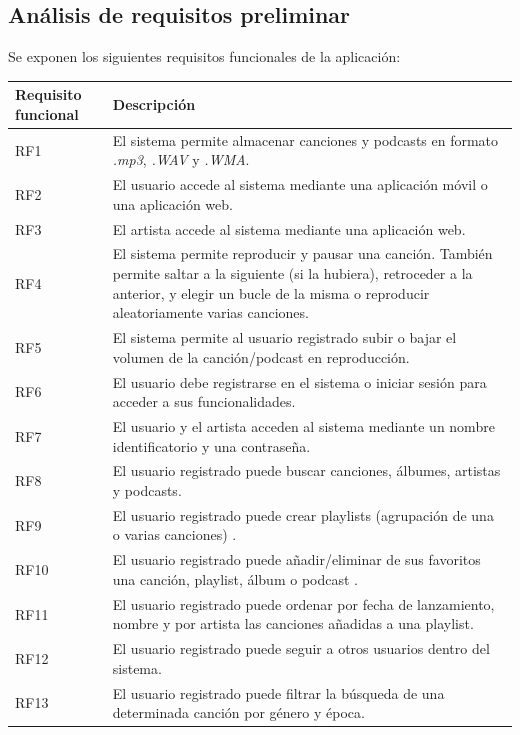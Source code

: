 \documentclass{article}
\begin{document}
\subsection{Análisis de requisitos preliminar}
Se exponen los siguientes requisitos funcionales de la aplicación:
\begin{table}[H]
	\begin{tabular}{p{4cm} p{10cm}}
		\hline
		\hline 
		\textbf{Requisito funcional}
		\vspace{0.5mm} & \textbf{Descripción} \\ 
		\hline
		\hline
		RF1
		& El sistema permite almacenar canciones y podcasts en formato \textit{.mp3}, \textit{.WAV} y \textit{.WMA}. \\ 
		\hline 
		RF2
		& El usuario accede al sistema mediante una aplicación móvil o una aplicación web. \\ 
		\hline
		RF3
		& El artista accede al sistema mediante una aplicación web. \\ 
		\hline
		RF4
		& El sistema permite reproducir y pausar una canción. También permite saltar a la siguiente (si la hubiera), retroceder a la anterior, y elegir un bucle de la misma o reproducir aleatoriamente varias canciones. \\ 
		\hline
		RF5
		& El sistema permite al usuario registrado subir o bajar el volumen de la canción/podcast en reproducción. \\ 
		\hline
		RF6
		& El usuario debe registrarse en el sistema o iniciar sesión para acceder a sus funcionalidades. \\ 
		\hline
		RF7
		& El usuario y el artista acceden al sistema mediante un nombre identificatorio y una contraseña. \\ 
		\hline
		RF8
		& El usuario registrado puede buscar canciones, álbumes, artistas y podcasts. \\ 
		\hline
		RF9
		& El usuario registrado puede crear playlists (agrupación de una o varias canciones) . \\ 
		\hline
		RF10
		& El usuario registrado puede añadir/eliminar de sus favoritos una canción, playlist, álbum o podcast . \\ 
		\hline
		RF11
		& El usuario registrado puede ordenar por fecha de lanzamiento, nombre y por artista las canciones añadidas a una playlist. \\ 
		\hline
		RF12
		&  El usuario registrado puede seguir a otros usuarios dentro del sistema.\\
		\hline
		RF13
		&  El usuario registrado puede filtrar la búsqueda de una determinada canción por género y época.\\

\end{tabular}
\end{table}
\end{document}
